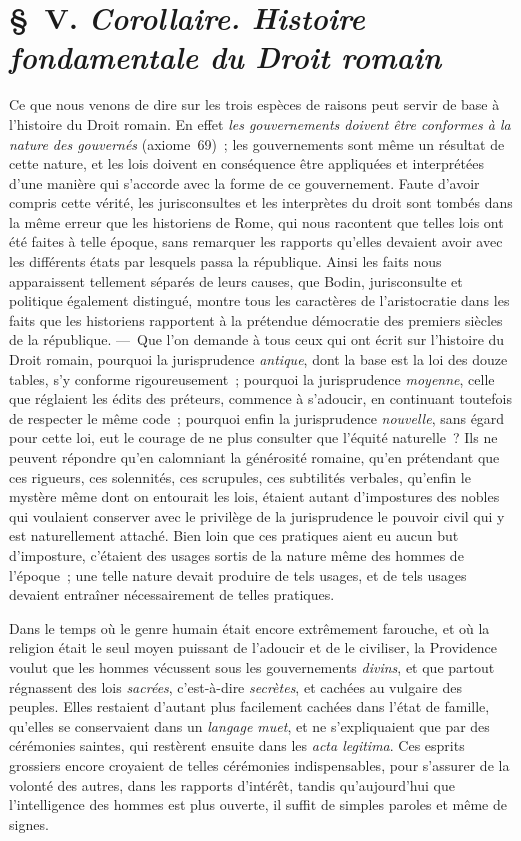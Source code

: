 \documentclass[french,twoside]{book} %
\begin{document}
\section[{§ V. Corollaire. Histoire fondamentale du Droit romain}]{§ V. {\itshape Corollaire. Histoire fondamentale du Droit romain}}
\noindent Ce que nous venons de dire sur les trois espèces de raisons peut servir de base à l’histoire du Droit romain. En effet {\itshape les gouvernements doivent être conformes à la nature des gouvernés} (axiome 69) ; les gouvernements sont même un résultat de cette nature, et les lois doivent en conséquence être appliquées  et interprétées d’une manière qui s’accorde avec la forme de ce gouvernement. Faute d’avoir compris cette vérité, les jurisconsultes et les interprètes du droit sont tombés dans la même erreur que les historiens de Rome, qui nous racontent que telles lois ont été faites à telle époque, sans remarquer les rapports qu’elles devaient avoir avec les différents états par lesquels passa la république. Ainsi les faits nous apparaissent tellement séparés de leurs causes, que Bodin, jurisconsulte et politique également distingué, montre tous les caractères de l’aristocratie dans les faits que les historiens rapportent à la prétendue démocratie des premiers siècles de la république. — Que l’on demande à tous ceux qui ont écrit sur l’histoire du Droit romain, pourquoi la jurisprudence {\itshape antique}, dont la base est la loi des douze tables, s’y conforme rigoureusement ; pourquoi la jurisprudence {\itshape moyenne}, celle que réglaient les édits des préteurs, commence à s’adoucir, en continuant toutefois de respecter le même code ; pourquoi enfin la jurisprudence {\itshape nouvelle}, sans égard pour cette loi, eut le courage de ne plus consulter que l’équité naturelle ? Ils ne peuvent répondre qu’en calomniant la générosité romaine, qu’en prétendant que ces rigueurs, ces solennités, ces scrupules, ces subtilités verbales, qu’enfin le mystère même dont on entourait les lois, étaient autant d’impostures des nobles qui voulaient conserver avec le privilège de la jurisprudence le pouvoir civil qui y est naturellement attaché. Bien  loin que ces pratiques aient eu aucun but d’imposture, c’étaient des usages sortis de la nature même des hommes de l’époque ; une telle nature devait produire de tels usages, et de tels usages devaient entraîner nécessairement de telles pratiques.\par
Dans le temps où le genre humain était encore extrêmement farouche, et où la religion était le seul moyen puissant de l’adoucir et de le civiliser, la Providence voulut que les hommes vécussent sous les gouvernements {\itshape divins}, et que partout régnassent des lois {\itshape sacrées}, c’est-à-dire {\itshape secrètes}, et cachées au vulgaire des peuples. Elles restaient d’autant plus facilement cachées dans l’état de famille, qu’elles se conservaient dans un {\itshape langage muet}, et ne s’expliquaient que par des cérémonies saintes, qui restèrent ensuite dans les {\itshape acta legitima}. Ces esprits grossiers encore croyaient de telles cérémonies indispensables, pour s’assurer de la volonté des autres, dans les rapports d’intérêt, tandis qu’aujourd’hui que l’intelligence des hommes est plus ouverte, il suffit de simples paroles et même de signes.\par
\end{document}
